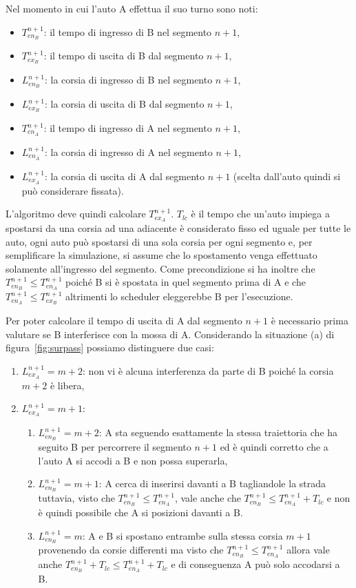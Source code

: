 \documentclass[11pt,a4paper]{report}
\begin{document}
Nel momento in cui l'auto A effettua il suo turno sono noti:
\begin{itemize}
\item $T_{en_B}^{n+1}$: il tempo di ingresso di B nel segmento $n+1$,
\item $T_{ex_B}^{n+1}$: il tempo di uscita di B dal segmento $n+1$,
\item $L_{en_B}^{n+1}$: la corsia di ingresso di B nel segmento $n+1$,
\item $L_{ex_B}^{n+1}$: la corsia di uscita di B dal segmento $n+1$,
\item $T_{en_A}^{n+1}$: il tempo di ingresso di A nel segmento $n+1$,
\item $L_{en_A}^{n+1}$: la corsia di ingresso di A nel segmento $n+1$,
\item $L_{ex_A}^{n+1}$: la corsia di uscita di A dal segmento $n+1$ (scelta dall'auto quindi si può considerare fissata).
\end{itemize}
L'algoritmo deve quindi calcolare $T_{ex_A}^{n+1}$.
$T_{lc}$ è il tempo che un'auto impiega a spostarsi da una corsia ad una adiacente è considerato fisso ed uguale per tutte le auto, ogni auto può spostarsi di una sola corsia per ogni segmento e, per semplificare la simulazione, si assume che lo spostamento venga effettuato solamente all'ingresso del segmento.
Come precondizione si ha inoltre che $T_{en_B}^{n+1} \leq T_{en_A}^{n+1}$ poiché B si è spostata in quel segmento prima di A e che $T_{en_A}^{n+1} \leq T_{ex_B}^{n+1}$ altrimenti lo scheduler eleggerebbe B per l'esecuzione.

Per poter calcolare il tempo di uscita di A dal segmento $n+1$ è necessario prima valutare se B interferisce con la mossa di A.
Considerando la situazione (a) di figura~\ref{fig:surpass} possiamo distinguere due casi:
\begin{enumerate}
\item $L_{ex_A}^{n+1} = m+2$: non vi è alcuna interferenza da parte di B poiché la corsia $m+2$ è libera,
\item $L_{ex_A}^{n+1} = m+1$:
  \begin{enumerate}
  \item $L_{en_B}^{n+1} = m+2$: A sta seguendo esattamente la stessa traiettoria che ha seguito B per percorrere il segmento $n+1$ ed è quindi corretto che a l'auto A si accodi a B e non possa superarla,
  \item $L_{en_B}^{n+1}  = m+1$: A cerca di inserirsi davanti a B tagliandole la strada tuttavia, visto che $T_{en_B}^{n+1} \leq T_{en_A}^{n+1}$, vale anche che $T_{en_B}^{n+1} \leq T_{en_A}^{n+1} + T_{lc}$ e non è quindi possibile che A si posizioni davanti a B.
  \item $L_{en_B}^{n+1} = m$: A e B si spostano entrambe sulla stessa corsia $m+1$ provenendo da corsie differenti ma visto che $T_{en_B}^{n+1} \leq T_{en_A}^{n+1}$ allora vale anche $T_{en_B}^{n+1} + T_{lc} \leq T_{en_A}^{n+1} + T_{lc}$ e di conseguenza A può solo accodarsi a B.
  \end{enumerate}
\end{enumerate}
\end{document}
